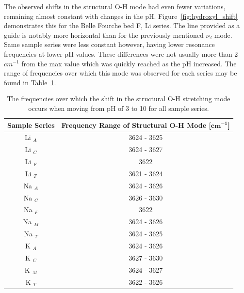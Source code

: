The observed shifts in the structural O-H mode had even fewer variations, remaining almost constant with changes in the pH. Figure~\ref{fig:hydroxyl_shift} demonstrates this for the Belle Fourche bed F, Li series. The line provided as a guide is notably more horizontal than for the previously mentioned $\nu_2$ mode. Same sample series were less constant however, having lower resonance frequencies at lower pH values. These differences were not usually more than 2$cm^{-1}$ from the max value which was quickly reached as the pH increased. The range of frequencies over which this mode was observed for each series may be found in Table~\ref{tab:structural_shifts}.

\begin{table}
	\centering
	\caption{The frequencies over which the shift in the structural O-H stretching mode occurs when moving from pH of 3 to 10 for all sample series.}
	\label{tab:structural_shifts}
	\begin{tabular}{|c||c|}
		\hline
		\textbf{Sample Series} & \textbf{Frequency Range of Structural O-H Mode [$\bm{cm^{-1}}$]} \\
		\hline
		\hline
		Li $_A$ & 3624 - 3625 \\
		\hline
		Li $_C$ & 3624 - 3627 \\
		\hline
		Li $_F$ & 3622 \\
		\hline
		Li $_T$ & 3621 - 3624 \\
		\hline
		Na $_A$ & 3624 - 3626 \\
		\hline
		Na $_C$ & 3626 - 3630 \\
		\hline
		Na $_F$ & 3622 \\
		\hline
		Na $_M$ & 3624 - 3626 \\
		\hline
		Na $_T$ & 3624 - 3625 \\
		\hline
		K $_A$ & 3624 - 3626 \\
		\hline
		K $_C$ & 3627 - 3630 \\
		\hline
		K $_M$ & 3624 - 3627 \\
		\hline
		K $_T$ & 3622 - 3626 \\
		\hline
	\end{tabular}
\end{table}


